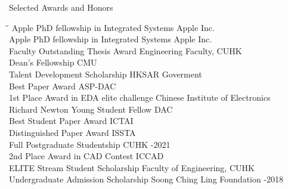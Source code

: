 
\begin{rSection}{Selected Awards and Honors}
\begin{tabbing}
\hspace{3.6in}\= \hspace{2.1in}\= \kill
Apple PhD fellowship in Integrated Systems \> Apple Inc.  \\
Apple PhD fellowship in Integrated Systems \> Apple Inc.  \\
Faculty Outstanding Thesis Award \> Engineering Faculty, CUHK  \\
Dean's Fellowship \> CMU  \\
Talent Development Scholarship \> HKSAR Goverment  \\
Best Paper Award                       \> ASP-DAC                       \\
1st Place Award in EDA elite challenge\> Chinese Institute of Electronics  \\
Richard Newton Young Student Fellow    \> DAC  \\
Best Student Paper Award                       \> ICTAI                       \\
Distinguished Paper Award                      \>ISSTA                      \\
Full Postgraduate Studentship   \>CUHK  -2021\\
     2nd Place Award in CAD Contest               \> ICCAD                       \\
    ELITE Stream Student Scholarship                \> Faculty of Engineering, CUHK                             \\
    Undergraduate Admission Scholarship                             \> Soong Ching Ling Foundation  -2018 \\
\end{tabbing}
\end{rSection}

